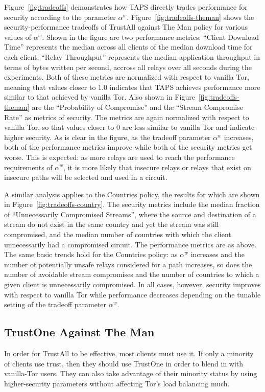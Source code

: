 \documentclass[conference]{styles/IEEEtran}
\newcommand{\ps}{TAPS\xspace}
\begin{document}
Figure~\ref{fig:tradeoffs} demonstrates how \ps directly trades performance for
security according to the parameter $\alpha^w$.
Figure~\ref{fig:tradeoffs-theman} shows the security-performance tradeoffs of
TrustAll against \textsf{The Man} policy for various values of $\alpha^w$. Shown in the
figure are two performance metrics: ``Client Download Time'' represents the
median across all clients of the median download time for each client; ``Relay
Throughput'' represents the median application throughput in terms of bytes
written per second, accross all relays over all seconds during the experiments.
Both of these metrics are normalized with respect to vanilla Tor, meaning that
values closer to 1.0 indicates that \ps achieves performance more similar to
that achieved by vanilla Tor. Also shown in Figure~\ref{fig:tradeoffs-theman}
are the ``Probability of Compromise'' and the ``Stream Compromise Rate'' as
metrics of security. The metrics are again normalized with respect to vanilla
Tor, so that values closer to 0 are less similar to vanilla Tor and indicate
higher security. As is clear in the figure, as the tradeoff parameter
$\alpha^w$ increases, both of the performance metrics improve while both of
the security metrics get worse. This is expected: as more relays are used to
reach the performance requirements of $\alpha^w$, it is more likely that
insecure relays or relays that exist on insecure paths will be selected and used
in a circuit.

A similar analysis applies to the \textsf{Countries} policy, the results for which are
shown in Figure~\ref{fig:tradeoffs-country}. The security metrics include the
median fraction of ``Unnecessarily Compromised Streams'', where the source and
destination of a stream do not exist in the same country and yet the stream was
still compromised, and the median number of countries with which the client
unnecessarily had a compromised circuit. The performance metrics are as above.
The same basic trends hold for the \textsf{Countries} policy: as $\alpha^w$
increases and the number of potentially unsafe relays considered for a path
increases, so does the number of avoidable stream compromises and the number of
countries to which a given client is unnecessarily compromised. In all
cases, however, security improves with respect to vanilla Tor while performance
decreases depending on the tunable setting of the tradeoff parameter
$\alpha^w$.

\subsection{TrustOne Against \textsf{The Man}}
In order for TrustAll to be effective, most clients must use it. If only a minority of clients
use trust, then they should use TrustOne in order to blend in with vanilla-Tor users. They can
also take advantage of their minority status by using higher-security parameters without
affecting Tor's load balancing much.
\end{document}
